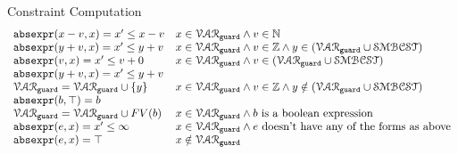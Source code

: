 \begin{defn}{Constraint Computation}
  \[
    \begin{array}{ll} 
      \mathtt{abs}{\mathtt{expr}}(x - v, x)  = x' \leq x - v  & x \in \mathcal{VAR}_{\mathtt{guard}} \land v \in \mathbb{N} \\
      \mathtt{abs}{\mathtt{expr}}(y + v, x)  = x' \leq y + v  & x \in \mathcal{VAR}_{\mathtt{guard}} \land v \in \mathbb{Z} \land y \in (\mathcal{VAR}_{\mathtt{guard}} \cup \mathcal{SMBCST}) \\
      \mathtt{abs}{\mathtt{expr}}(v, x)  = x' \leq v + 0  & x \in \mathcal{VAR}_{\mathtt{guard}} \land v \in (\mathcal{VAR}_{\mathtt{guard}} \cup \mathcal{SMBCST}) \\
      \mathtt{abs}{\mathtt{expr}}(y + v, x)  = x' \leq y + v & \\
      \mathcal{VAR}_{\mathtt{guard}} = \mathcal{VAR}_{\mathtt{guard}} \cup \{y\} & x \in \mathcal{VAR}_{\mathtt{guard}} \land v \in \mathbb{Z} \land y \notin (\mathcal{VAR}_{\mathtt{guard}} \cup \mathcal{SMBCST})  \\
      \mathtt{abs}{\mathtt{expr}}(b, \top) = b   & \\
      \mathcal{VAR}_{\mathtt{guard}} = \mathcal{VAR}_{\mathtt{guard}} \cup FV(b) &  x \in \mathcal{VAR}_{\mathtt{guard}} \land b \text{ is a boolean expression} \\
      \mathtt{abs}{\mathtt{expr}}(e, x) = x' \leq \infty  &  x \in \mathcal{VAR}_{\mathtt{guard}} \land e \text{ doesn't have any of the forms as above} \\
      \mathtt{abs}{\mathtt{expr}}(e, x) = \top  &  x \notin \mathcal{VAR}_{\mathtt{guard}} \\
    \end{array}
    \]
  \end{defn}
  
